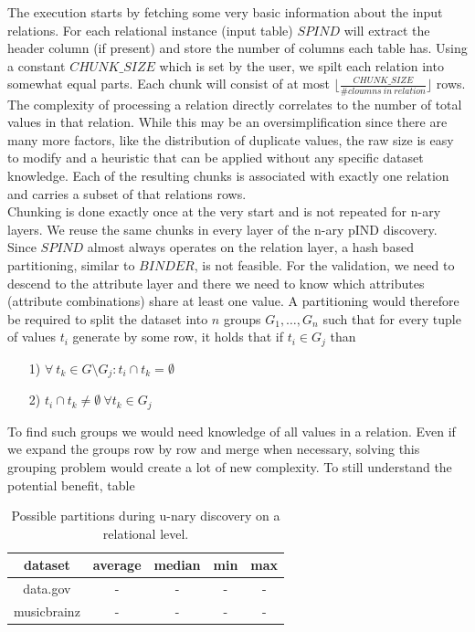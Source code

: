 \noindent The execution starts by fetching some very basic information about the input relations. For each relational instance (input table) $SPIND$ will extract the header column (if present) and store the number of columns each table has. Using a constant $CHUNK\_SIZE$ which is set by the user, we spilt each relation into somewhat equal parts. Each chunk will consist of at most $\lfloor \frac{CHUNK\_SIZE}{\# cloumns \: in \: relation} \rfloor$ rows. The complexity of processing a relation directly correlates to the number of total values in that relation. While this may be an oversimplification since there are many more factors, like the distribution of duplicate values, the raw size is easy to modify and a heuristic that can be applied without any specific dataset knowledge. Each of the resulting chunks is associated with exactly one relation and carries a subset of that relations rows. \\

\noindent Chunking is done exactly once at the very start and is not repeated for n-ary layers. We reuse the same chunks in every layer of the n-ary pIND discovery. \\

\noindent Since $SPIND$ almost always operates on the relation layer, a hash based partitioning, similar to $BINDER$, is not feasible. For the validation, we need to descend to the attribute layer and there we need to know which attributes (attribute combinations) share at least one value. A partitioning would therefore be required to split the dataset into $n$ groups $G_1, \dots, G_n$ such that for every tuple of values $t_i$ generate by some row, it holds that if $t_i \in G_j$ than 
\begin{itemize}
    \item[1)] $\forall \: t_k \in G \setminus G_j : t_i \cap t_k = \emptyset$
    \item[2)] $t_i \cap t_k \not = \emptyset \: \forall t_k \in G_j$
\end{itemize}
To find such groups we would need knowledge of all values in a relation. Even if we expand the groups row by row and merge when necessary, solving this grouping problem would create a lot of new complexity. To still understand the potential benefit, table 

\begin{table}
    \label{tab:partitioning}
    \begin{tabular}{c|c|c|c|c} 
     dataset & average & median & min & max\\ 
     \hline\hline
     data.gov & - & - & - & -\\ 
     \hline
     musicbrainz & - & - & - & -\\
    \end{tabular}
    \caption{Possible partitions during u-nary discovery on a relational level.}
\end{table}

